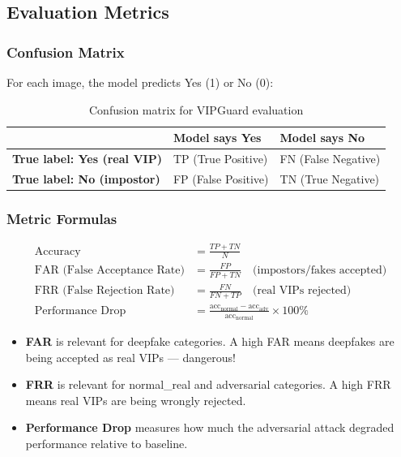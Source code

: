 \documentclass[12pt,a4paper]{article}
\begin{document}
\subsection{Evaluation Metrics}

\subsubsection{Confusion Matrix}

For each image, the model predicts Yes (1) or No (0):

\begin{table}[H]
\centering
\caption{Confusion matrix for VIPGuard evaluation}
\begin{tabular}{@{}lll@{}}
\toprule
 & \textbf{Model says Yes} & \textbf{Model says No} \\
\midrule
\textbf{True label: Yes (real VIP)} & TP (True Positive) & FN (False Negative) \\
\textbf{True label: No (impostor)}  & FP (False Positive) & TN (True Negative) \\
\bottomrule
\end{tabular}
\end{table}

\subsubsection{Metric Formulas}

\begin{align}
\text{Accuracy} &= \frac{TP + TN}{N} \\[6pt]
\text{FAR (False Acceptance Rate)} &= \frac{FP}{FP + TN} \quad \text{(impostors/fakes accepted)} \\[6pt]
\text{FRR (False Rejection Rate)} &= \frac{FN}{FN + TP} \quad \text{(real VIPs rejected)} \\[6pt]
\text{Performance Drop} &= \frac{\text{acc}_{\text{normal}} - \text{acc}_{\text{adv}}}{\text{acc}_{\text{normal}}} \times 100\%
\end{align}

\begin{itemize}
    \item \textbf{FAR} is relevant for deepfake categories. A high FAR means deepfakes are being accepted as real VIPs --- dangerous!
    \item \textbf{FRR} is relevant for normal\_real and adversarial categories. A high FRR means real VIPs are being wrongly rejected.
    \item \textbf{Performance Drop} measures how much the adversarial attack degraded performance relative to baseline.
\end{itemize}
\end{document}
